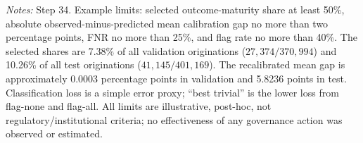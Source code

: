 \documentclass[10pt]{article}
\begin{document}
\begin{table}[!ht]
\centering
\caption{Retrospective illustrative governance alerts in the validation and test windows, using unchanged validation-selected thresholds.}
\label{tab:supp_governance}
\vspace{2pt}
{\footnotesize \textit{Notes:} Step 34. Example limits: selected outcome-maturity share at least 50\%, absolute observed-minus-predicted mean calibration gap no more than two percentage points, FNR no more than 25\%, and flag rate no more than 40\%. The selected shares are 7.38\% of all validation originations ($27{,}374/370{,}994$) and 10.26\% of all test originations ($41{,}145/401{,}169$). The recalibrated mean gap is approximately 0.0003 percentage points in validation and 5.8236 points in test. Classification loss is a simple error proxy; ``best trivial'' is the lower loss from flag-none and flag-all. All limits are illustrative, post-hoc, not regulatory/institutional criteria; no effectiveness of any governance action was observed or estimated.}
\end{table}
\end{document}
